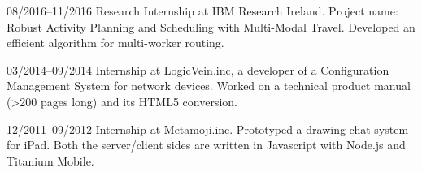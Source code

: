 \documentclass[letterpaper,12pt]{article}
\begin{document}
\begin{CV}
\item[08/2016--11/2016] Research Internship at IBM Research Ireland.
 Project name: Robust Activity Planning and Scheduling with Multi-Modal Travel.
 Developed an efficient algorithm for multi-worker routing.

\item[03/2014--09/2014] Internship at LogicVein.inc,
 a developer of a Configuration Management System
 for network devices.
 Worked on %
 a technical product manual (>200 pages long) %
 and its HTML5 conversion.



\item[12/2011--09/2012] Internship at Metamoji.inc.  Prototyped a
  drawing-chat system for iPad. Both the server/client sides are
  written in Javascript with Node.js and Titanium Mobile.
\end{CV}
\end{document}
